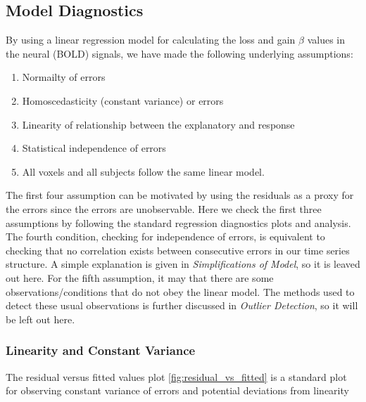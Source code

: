 \subsection{Model Diagnostics}
By using a linear regression model for calculating the loss and gain $\beta $ 
values in the neural (BOLD) signals, we have made the following underlying 
assumptions:
\begin{enumerate}
    \item Normailty of errors
    \item Homoscedasticity (constant variance) or errors  
    \item Linearity of relationship between the explanatory and response
    \item Statistical independence of errors   
    \item All voxels and all subjects follow the same linear model. 
\end{enumerate}
The first four assumption can be motivated by using the residuals as a proxy
for the errors since the errors are unobservable. Here we check the first 
three assumptions by following the standard regression diagnostics plots and 
analysis. The fourth condition, checking for independence of errors, is 
equivalent to checking that no correlation exists between consecutive errors 
in our time series structure. A simple explanation is given in 
\textit{Simplifications of Model}, so it is leaved out here. For the fifth 
assumption, it may that there are some observations/conditions that do not 
obey the linear model. The methods used to detect these usual observations is 
further discussed in \textit{Outlier Detection}, so it will be left out here. 

\subsubsection{Linearity and Constant Variance}
The residual versus fitted values plot \ref{fig:residual_vs_fitted} is a 
standard plot for observing constant variance of errors and potential deviations
from linearity

